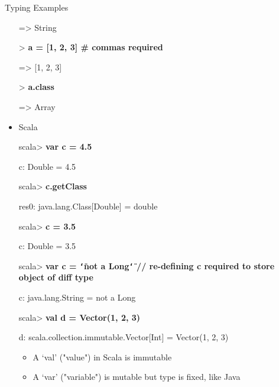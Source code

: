 \documentclass{beamer}
\renewcommand{\textquotedbl}{\texttt{\char`\"}}
\begin{document}
\begin{frame}[allowframebreaks]{Typing Examples}
\begin{itemize}
\begin{small}
{\ttfamily\color{black}
={\textgreater} String}

{\ttfamily\color{black}
\textcolor[rgb]{0.0,0.0,0.8039216}{{\textgreater} }\textbf{a = [1, 2, 3]
\# commas required}}

{\ttfamily\color{black}
={\textgreater} [1, 2, 3]}

{\ttfamily\color{black}
\textcolor[rgb]{0.0,0.0,0.8039216}{{\textgreater} }\textbf{a.class}}

{\ttfamily\color{black}
={\textgreater} Array}
\end{small}
  \item Scala\\
\begin{small}
{\ttfamily\color{black}
%
\textcolor[rgb]{0.0,0.0,0.8039216}{scala{\textgreater} }\textbf{var c =
4.5}}

{\ttfamily\color[rgb]{0.54509807,0.13333334,0.32156864}
c: Double = 4.5}


\bigskip

{\ttfamily\color{black}
\textcolor[rgb]{0.0,0.0,0.8039216}{scala{\textgreater}
}\textbf{c.getClass}}

{\ttfamily\color[rgb]{0.54509807,0.13333334,0.32156864}
res0: java.lang.Class[Double] = double}


\bigskip

{\ttfamily\color{black}
\textcolor[rgb]{0.0,0.0,0.8039216}{scala{\textgreater} }\textbf{c =
3.5}}

{\ttfamily\color[rgb]{0.54509807,0.13333334,0.32156864}
c: Double = 3.5}


\bigskip

{\ttfamily\color{black}
\textcolor[rgb]{0.0,0.0,0.8039216}{scala{\textgreater} }\textbf{var c =
{\textquotedbl}not a Long{\textquotedbl} // re-defining c required to
store object of diff type}}

{\ttfamily\color[rgb]{0.54509807,0.13333334,0.32156864}
c: java.lang.String = not a Long}


\bigskip

{\ttfamily\color{black}
\textcolor[rgb]{0.0,0.0,0.8039216}{scala{\textgreater} }\textbf{val d =
Vector(1, 2, 3)}}

{\ttfamily\color[rgb]{0.54509807,0.13333334,0.32156864}
d: scala.collection.immutable.Vector[Int] = Vector(1, 2, 3)}
\end{small}
  \begin{itemize}
  \item A `val' ("value") in Scala is immutable
  \item A `var' ("variable") is mutable but type is fixed, like Java
  \end{itemize}
  \end{itemize}
\end{frame}
\end{document}
